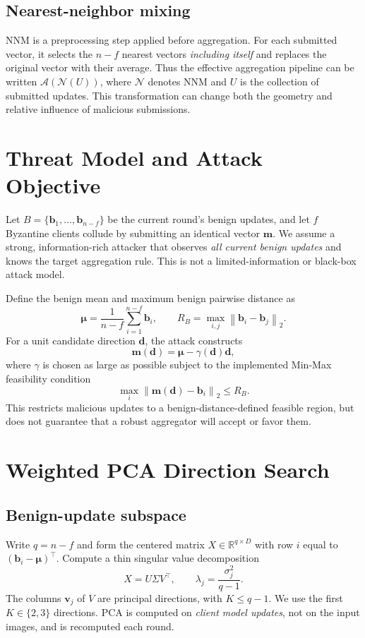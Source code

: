 \documentclass[11pt,a4paper]{article}
\newcommand{\norm}[1]{\left\lVert#1\right\rVert_2}
\newcommand{\mean}{\boldsymbol{\mu}}
\newcommand{\mal}{\boldsymbol{m}}
\newcommand{\dir}{\boldsymbol{d}}
\newcommand{\agg}{\mathcal{A}}
\begin{document}
\subsection{Nearest-neighbor mixing}
NNM is a preprocessing step applied before aggregation. For each submitted vector, it selects the $n-f$ nearest vectors \emph{including itself} and replaces the original vector with their average. Thus the effective aggregation pipeline can be written $\agg(\mathcal{N}(U))$, where $\mathcal{N}$ denotes NNM and $U$ is the collection of submitted updates. This transformation can change both the geometry and relative influence of malicious submissions.

\section{Threat Model and Attack Objective}
Let $B=\{\boldsymbol{b}_1,\ldots,\boldsymbol{b}_{n-f}\}$ be the current round's benign updates, and let $f$ Byzantine clients collude by submitting an identical vector $\mal$. We assume a strong, information-rich attacker that observes \emph{all current benign updates} and knows the target aggregation rule. This is not a limited-information or black-box attack model.

Define the benign mean and maximum benign pairwise distance as
\begin{equation}
\mean=\frac{1}{n-f}\sum_{i=1}^{n-f}\boldsymbol{b}_i,\qquad
R_B=\max_{i,j}\norm{\boldsymbol{b}_i-\boldsymbol{b}_j}.
\end{equation}
For a unit candidate direction $\dir$, the attack constructs
\begin{equation}\label{eq:mal}
\mal(\dir)=\mean-\gamma(\dir)\dir,
\end{equation}
where $\gamma$ is chosen as large as possible subject to the implemented Min-Max feasibility condition
\begin{equation}\label{eq:constraint}
\max_i\norm{\mal(\dir)-\boldsymbol{b}_i}\leq R_B.
\end{equation}
This restricts malicious updates to a benign-distance-defined feasible region, but does not guarantee that a robust aggregator will accept or favor them.

\section{Weighted PCA Direction Search}
\subsection{Benign-update subspace}
Write $q=n-f$ and form the centered matrix $X\in\mathbb{R}^{q\times D}$ with row $i$ equal to $(\boldsymbol{b}_i-\mean)^\top$. Compute a thin singular value decomposition
\begin{equation}
X=U\Sigma V^\top,\qquad \lambda_j=\frac{\sigma_j^2}{q-1}.
\end{equation}
The columns $\boldsymbol{v}_j$ of $V$ are principal directions, with $K\leq q-1$. We use the first $K\in\{2,3\}$ directions. PCA is computed on \emph{client model updates}, not on the input images, and is recomputed each round.
\end{document}
